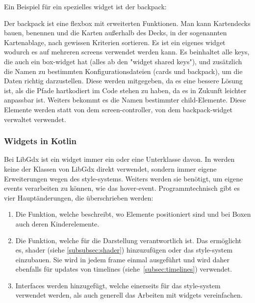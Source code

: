 Ein Beispiel für ein spezielles widget ist der backpack:
Der backpack ist eine flexbox mit erweiterten Funktionen.
Man kann Kartendecks bauen, benennen und die Karten außerhalb des Decks, in der sogenannten Kartenablage, nach gewissen Kriterien sortieren.
Es ist ein eigenes widget wodurch es auf mehreren screens verwendet werden kann.
Es beinhaltet alle keys, die auch ein box-widget hat (alles ab den "widget shared keys"), und zusätzlich die Namen zu bestimmten Konfigurationsdateien (cards und backpack), um die Daten richtig darzustellen.
Diese werden mitgegeben, da es eine bessere Lösung ist, als die Pfade hartkodiert im Code stehen zu haben, da es in Zukunft leichter anpassbar ist.
Weiters bekommt es die Namen bestimmter child-Elemente.
Diese Elemente werden statt von dem screen-controller, von dem backpack-widget verwaltet \bzw verwendet.

\vfill
\pagebreak

\renewcommand{\kapitelautor}{Autor: Felix Zwickelstorfer}
\subsubsection{Widgets in Kotlin}\label{subsubsec:widgetsinkotlin}
\renewcommand{\kapitelautor}{Autor: Felix Zwickelstorfer}
Bei LibGdx ist ein widget immer ein  oder eine Unterklasse davon.
In \FF werden keine der Klassen von LibGdx direkt verwendet, sondern immer eigene Erweiterungen \zB wegen des style-systems.
Weiters werden sie benötigt, um eigene events verarbeiten zu können, wie das hover-event.
Programmtechnisch gibt es vier Hauptänderungen, die überschrieben werden:
\begin{enumerate}
    \item Die  Funktion, welche beschreibt, wo Elemente positioniert sind und bei Boxen auch deren Kinderelemente.
    \item Die  Funktion, welche für die Darstellung verantwortlich ist. Das ermöglicht es, shader (siehe \ref{subsubsec:shader}) hinzuzufügen oder das style-system einzubauen.
    Sie wird in jedem frame einmal ausgeführt und wird daher ebenfalls für updates von timelines (siehe~\ref{subsec:timelines}) verwendet.
    \item Interfaces werden hinzugefügt, welche einerseits für das style-system verwendet werden, als auch generell das Arbeiten mit widgets vereinfachen.
\end{enumerate}
\renewcommand{\kapitelautor}{Autor: Felix Zwickelstorfer}
